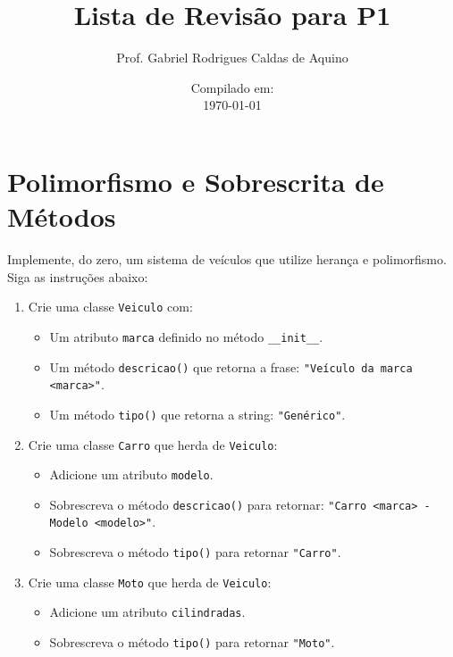 \title{Lista de Revisão para P1}
\author{Prof. Gabriel Rodrigues Caldas de Aquino}
\date{Compilado em: \\ \today}



\maketitle

\section{Polimorfismo e Sobrescrita de Métodos}
Implemente, do zero, um sistema de veículos que utilize herança e polimorfismo.
Siga as instruções abaixo:

\begin{enumerate}
    \item Crie uma classe \texttt{Veiculo} com:
          \begin{itemize}
              \item Um atributo \texttt{marca} definido no método \texttt{\_\_init\_\_}.
              \item Um método \texttt{descricao()} que retorna a frase: \texttt{"Veículo da marca <marca>"}.
              \item Um método \texttt{tipo()} que retorna a string: \texttt{"Genérico"}.
          \end{itemize}

    \item Crie uma classe \texttt{Carro} que herda de \texttt{Veiculo}:
          \begin{itemize}
              \item Adicione um atributo \texttt{modelo}.
              \item Sobrescreva o método \texttt{descricao()} para retornar: \texttt{"Carro <marca> - Modelo <modelo>"}.
              \item Sobrescreva o método \texttt{tipo()} para retornar \texttt{"Carro"}.
          \end{itemize}

    \item Crie uma classe \texttt{Moto} que herda de \texttt{Veiculo}:
          \begin{itemize}
              \item Adicione um atributo \texttt{cilindradas}.
              \item Sobrescreva o método \texttt{tipo()} para retornar \texttt{"Moto"}.
          \end{itemize}


\end{enumerate}
